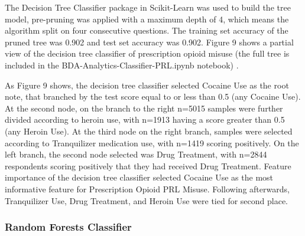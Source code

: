 \documentclass[sigconf]{acmart}
\begin{document}
The Decision Tree Classifier package in Scikit-Learn was used to build the 
tree model, pre-pruning was applied with a maximum depth of 4, which means 
the algorithm split on four consecutive questions. The training set accuracy 
of the pruned tree was 0.902 and test set accuracy was 0.902. Figure 9 shows 
a partial view of the decision tree classifier of prescription opioid misuse
(the full tree is included in the BDA-Analytics-Classifier-PRL.ipynb 
notebook) \cite{classifyPRL}. 

As Figure 9 shows, the decision tree classifier
selected Cocaine Use as the root note, that branched by the test score equal
to or less than 0.5 (any Cocaine Use). At the second node, on the branch to 
the right n=5015 samples were further divided according to heroin use, with 
n=1913 having a score greater than 0.5 (any Heroin Use). At the third node
on the right branch, samples were selected according to Tranquilizer
medication use, with n=1419 scoring positively. On the left branch, the 
second node selected was Drug Treatment, with n=2844 respondents scoring
positively that they had received Drug Treatment. Feature importance of
the decision tree classifier selected Cocaine Use as the most informative
feature for Prescription Opioid PRL Misuse. Following afterwards, 
Tranquilizer Use, Drug Treatment, and Heroin Use were tied for second place. 


\subsubsection{Random Forests Classifier}
\end{document}
